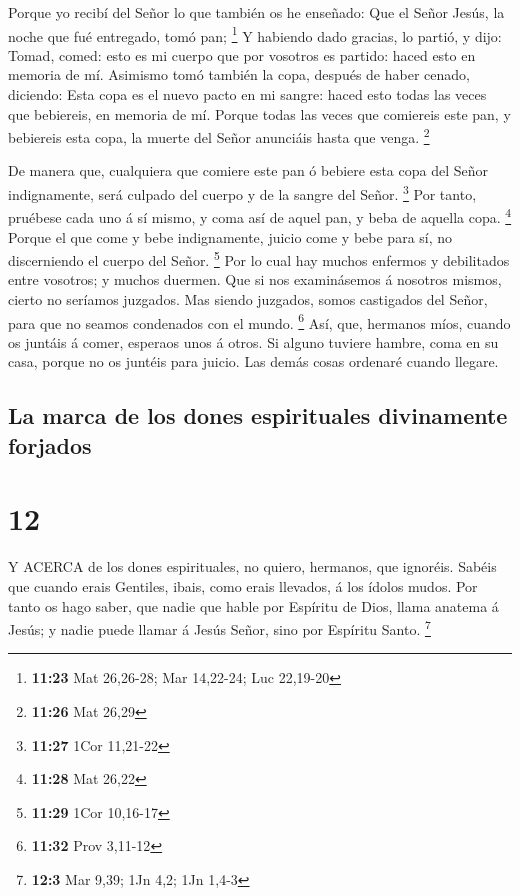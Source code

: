  Porque yo recibí del Señor lo que también os he enseñado:
Que el Señor Jesús, la noche que fué entregado, tomó pan; \footnote{\textbf{11:23}
  Mat 26,26-28; Mar 14,22-24; Luc 22,19-20}  Y habiendo
dado gracias, lo partió, y dijo: Tomad, comed: esto es mi cuerpo que por
vosotros es partido: haced esto en memoria de mí.  Asimismo
tomó también la copa, después de haber cenado, diciendo: Esta copa es el
nuevo pacto en mi sangre: haced esto todas las veces que bebiereis, en
memoria de mí.  Porque todas las veces que comiereis este
pan, y bebiereis esta copa, la muerte del Señor anunciáis hasta que
venga. \footnote{\textbf{11:26} Mat 26,29}

 De manera que, cualquiera que comiere este pan ó bebiere
esta copa del Señor indignamente, será culpado del cuerpo y de la sangre
del Señor. \footnote{\textbf{11:27} 1Cor 11,21-22}  Por
tanto, pruébese cada uno á sí mismo, y coma así de aquel pan, y beba de
aquella copa. \footnote{\textbf{11:28} Mat 26,22}  Porque
el que come y bebe indignamente, juicio come y bebe para sí, no
discerniendo el cuerpo del Señor. \footnote{\textbf{11:29} 1Cor 10,16-17}
 Por lo cual hay muchos enfermos y debilitados entre
vosotros; y muchos duermen.  Que si nos examinásemos á
nosotros mismos, cierto no seríamos juzgados.  Mas siendo
juzgados, somos castigados del Señor, para que no seamos condenados con
el mundo. \footnote{\textbf{11:32} Prov 3,11-12}  Así, que,
hermanos míos, cuando os juntáis á comer, esperaos unos á otros.
 Si alguno tuviere hambre, coma en su casa, porque no os
juntéis para juicio. Las demás cosas ordenaré cuando llegare.

\hypertarget{la-marca-de-los-dones-espirituales-divinamente-forjados}{%
\subsection{La marca de los dones espirituales divinamente
forjados}\label{la-marca-de-los-dones-espirituales-divinamente-forjados}}

\hypertarget{section-11}{%
\section{12}\label{section-11}}

 Y ACERCA de los dones espirituales, no quiero, hermanos,
que ignoréis.  Sabéis que cuando erais Gentiles, ibais, como
erais llevados, á los ídolos mudos.  Por tanto os hago
saber, que nadie que hable por Espíritu de Dios, llama anatema á Jesús;
y nadie puede llamar á Jesús Señor, sino por Espíritu Santo. \footnote{\textbf{12:3}
  Mar 9,39; 1Jn 4,2; 1Jn 1,4-3}

